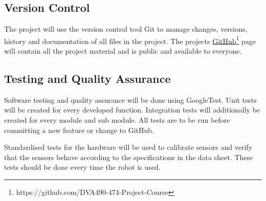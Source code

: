 

\subsection{Version Control}
\label{subsection:version_control}

The project will use the version control tool Git to manage changes, versions, history and documentation of all files in the project. The projects \href{https://github.com/DVA490-474-Project-Course}{GitHub}\footnote{https://github.com/DVA490-474-Project-Course} page will contain all the project material and is public and available to everyone.



\subsection{Testing and Quality Assurance}

Software testing and quality assurance will be done using GoogleTest. Unit tests will be created for every developed function. Integration tests will additionally be created for every module and sub module. All tests are to be run before committing a new feature or change to GitHub.

Standardised tests for the hardware will be used to calibrate sensors and verify that the sensors behave according to the specifications in the data sheet. These tests should be done every time the robot is used.



